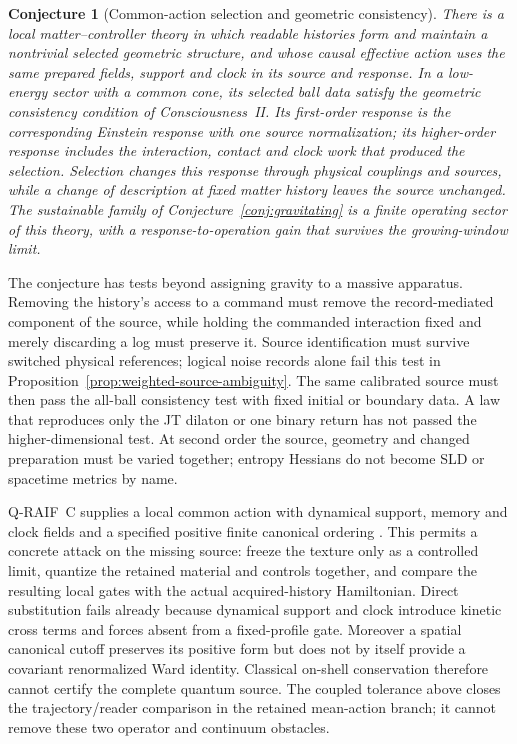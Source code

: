 \documentclass[12pt,a4paper]{article}
\newtheorem{conjecture}[theorem]{Conjecture}
\begin{document}
\begin{conjecture}[Common-action selection and geometric consistency]
\label{conj:common-action-selection}
There is a local matter--controller theory in which readable histories
form and maintain a nontrivial selected geometric structure, and whose
causal effective action uses the same prepared fields, support and clock
in its source and response. In a low-energy sector with a common cone,
its selected ball data satisfy the geometric consistency condition of
Consciousness~II. Its first-order response is the corresponding Einstein
response with one source normalization; its higher-order response includes
the interaction, contact and clock work that produced the selection.
Selection changes this response through physical couplings and sources,
while a change of description at fixed matter history leaves the source
unchanged. The sustainable family of Conjecture~\ref{conj:gravitating}
is a finite operating sector of this theory, with a response-to-operation
gain that survives the growing-window limit.
\end{conjecture}

The conjecture has tests beyond assigning gravity to a massive apparatus.
Removing the history's access to a command must remove the
record-mediated component of the source, while holding the commanded
interaction fixed and merely discarding a log must preserve it.
Source identification must survive switched physical references;
logical noise records alone fail this test in
Proposition~\ref{prop:weighted-source-ambiguity}.
The same calibrated source must then pass the all-ball consistency
test with fixed initial or boundary data. A law that reproduces only
the JT dilaton or one binary return has not passed the higher-dimensional
test. At second order the source, geometry and changed preparation must
be varied together; entropy Hessians do not become SLD or spacetime
metrics by name.

Q-RAIF~C supplies a local common action with dynamical support, memory
and clock fields and a specified positive finite canonical ordering
\cite{QRC}. This permits a concrete attack on the missing source:
freeze the texture only as a controlled limit, quantize the retained
material and controls together, and compare the resulting local gates
with the actual acquired-history Hamiltonian. Direct substitution fails
already because dynamical support and clock introduce kinetic cross
terms and forces absent from a fixed-profile gate. Moreover a spatial
canonical cutoff preserves its positive form but does not by itself
provide a covariant renormalized Ward identity. Classical on-shell
conservation therefore cannot certify the complete quantum source.
The coupled tolerance above closes the trajectory/reader comparison in
the retained mean-action branch; it cannot remove these two operator
and continuum obstacles.
\end{document}
